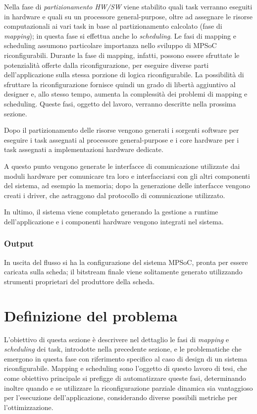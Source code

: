 Nella fase di \emph{partizionamento HW/SW} viene stabilito quali task verranno
eseguiti in hardware e quali su un processore general-purpose, oltre ad assegnare le risorse computazionali ai vari task in
base al partizionamento calcolato (fase di
\emph{mapping}); in questa fase si effettua anche lo
\emph{scheduling}. Le fasi di mapping e scheduling assumono particolare
importanza nello sviluppo di \ac{MPSoC} riconfigurabili. Durante la fase di mapping,
infatti, possono essere sfruttate le potenzialit\`a offerte dalla riconfigurazione,
per eseguire diverse parti dell'applicazione sulla stessa porzione di logica riconfigurabile.
La possibilit\`a di sfruttare la riconfigurazione fornisce quindi un grado di libert\`a aggiuntivo
al designer e, allo stesso tempo, aumenta la complessit\`a dei problemi di mapping e scheduling.
Queste fasi, oggetto del lavoro, verranno descritte nella prossima sezione.

Dopo il partizionamento delle risorse vengono generati i sorgenti software per
eseguire i task assegnati al processore general-purpose e i core hardware per i
task assegnati a implementazioni hardware dedicate.

A questo punto vengono generate le interfacce di comunicazione utilizzate dai
moduli hardware per comunicare tra loro e interfacciarsi con gli altri
componenti del sistema, ad esempio la memoria; dopo la generazione delle
interfacce vengono creati i driver, che astraggono dal protocollo di
comunicazione utilizzato.

In ultimo, il sistema viene completato generando la gestione a runtime dell'applicazione e i componenti
hardware vengono integrati nel sistema.

\subsubsection{Output}
In uscita del flusso si ha la configurazione del sistema MPSoC, pronta per essere caricata sulla scheda;
il bitstream finale viene solitamente generato utilizzando strumenti proprietari del produttore della scheda.


\section{Definizione del problema}
\label{sec:definizioneProblema}
L'obiettivo di questa sezione \`e descrivere nel dettaglio le fasi di \emph{mapping} e \emph{scheduling}
dei task, introdotte nella precedente sezione, e le problematiche che emergono in questa fase con riferimento
specifico al caso di design di un sistema riconfigurabile.
Mapping e scheduling sono l'oggetto di questo lavoro di tesi, che come obiettivo principale si prefigge di
automatizzare queste fasi, determinando inoltre quando e se utilizzare la riconfigurazione parziale dinamica
sia vantaggioso per l'esecuzione dell'applicazione, considerando diverse possibili metriche per l'ottimizzazione.

